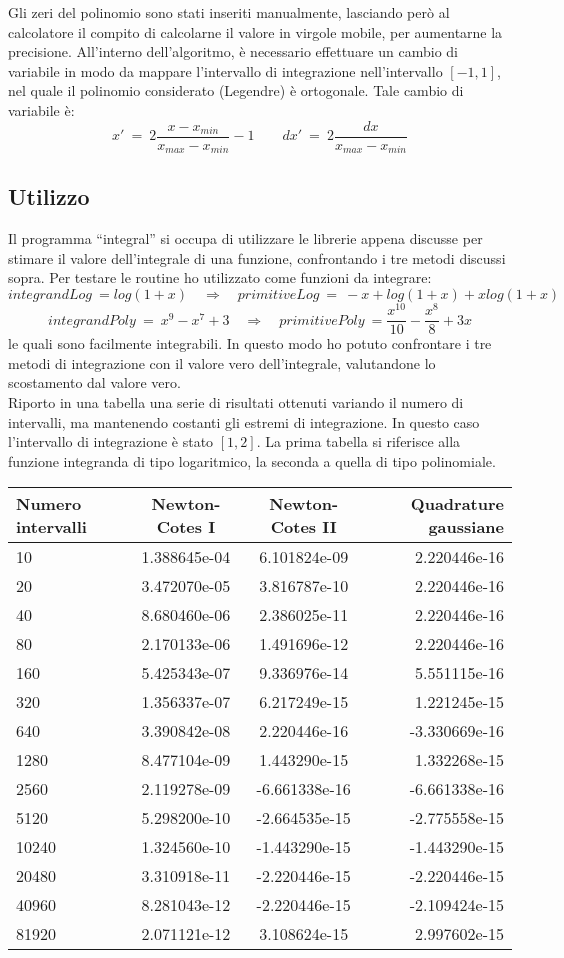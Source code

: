 Gli zeri del polinomio sono stati inseriti manualmente, lasciando però al calcolatore il compito di calcolarne il valore in virgole mobile,
per aumentarne la precisione.
All'interno dell'algoritmo, è necessario effettuare un cambio di variabile in modo da mappare l'intervallo
di integrazione nell'intervallo $[-1,1]$, nel quale il polinomio considerato (Legendre) è ortogonale.
Tale cambio di variabile è:
$$
	x' \ = \ 2 \frac{x - x_{min} }{x_{max}-x_{min}} - 1 \qquad dx'  \ = \ 2 \frac{dx}{x_{max}-x_{min}}
$$
\subsection*{Utilizzo}
Il programma ``integral'' si occupa di utilizzare le librerie appena discusse per stimare il valore dell'integrale di una funzione, confrontando i
tre metodi discussi sopra. Per testare le routine ho utilizzato come funzioni da integrare:
$$
  integrandLog \ = log ( 1+x) \quad \Rightarrow \quad primitiveLog \ = \ -x + log(1 + x) + x log(1 + x)
$$
$$
 integrandPoly \ = \ 	x^9 - x^7 + 3 \quad \Rightarrow \quad primitivePoly \ = \frac{x^{10}}{10} - \frac{x^8}{8} + 3x
$$
le quali sono facilmente integrabili. In questo modo ho potuto confrontare i tre metodi di integrazione con il valore vero dell'integrale, valutandone
lo scostamento dal valore vero.\\
Riporto in una tabella una serie di risultati ottenuti variando il numero di intervalli, ma mantenendo costanti gli estremi di integrazione.
In questo caso l'intervallo di integrazione è stato $[1,2]$.
La prima tabella si riferisce alla funzione integranda di tipo logaritmico, la seconda a quella di tipo polinomiale.
\begin{tabular}{lccr}
\toprule
  Numero intervalli & Newton-Cotes I & Newton-Cotes II & Quadrature gaussiane \\
\midrule
  10 &	1.388645e-04 &	6.101824e-09 &	2.220446e-16 \\
20 &	3.472070e-05 &	3.816787e-10 &	2.220446e-16 \\ 
40 &	8.680460e-06 &	2.386025e-11 &	2.220446e-16 \\ 
80 &	2.170133e-06 &	1.491696e-12 &	2.220446e-16 \\
160 &	5.425343e-07 &	9.336976e-14 &	5.551115e-16 \\ 
320 &	1.356337e-07 &	6.217249e-15 &	1.221245e-15 \\
640 &	3.390842e-08 &	2.220446e-16 &	-3.330669e-16 \\
1280 &	8.477104e-09 &	1.443290e-15 &	1.332268e-15 \\ 
2560 &	2.119278e-09 &	-6.661338e-16 & -6.661338e-16 \\
5120 &	5.298200e-10 &	-2.664535e-15 &	-2.775558e-15 \\
10240 &	1.324560e-10 &	-1.443290e-15 &	-1.443290e-15 \\ 
20480 &	 3.310918e-11 &	-2.220446e-15 &	-2.220446e-15 \\
40960 &	8.281043e-12 &	-2.220446e-15 &	-2.109424e-15 \\
81920 &	2.071121e-12 &	3.108624e-15 &	2.997602e-15 \\
\bottomrule
\end{tabular}

